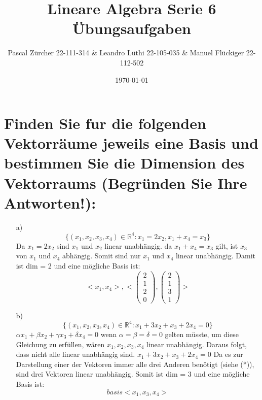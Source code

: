 \documentclass{article}
\author{
Pascal Zürcher 22-111-314 & 
Leandro Lüthi 22-105-035 & 
Manuel Flückiger 22-112-502}
\title{Lineare Algebra Serie 6 Übungsaufgaben}
\date{\today}
\begin{document}
\maketitle



\section{Finden Sie fur die folgenden Vektorräume jeweils eine Basis und
bestimmen Sie die Dimension des Vektorraums (Begründen Sie Ihre Antworten!):}
    \begin{enumerate}

        \item[a)] \[\{(x_1, x_2, x_3, x_4) ∈ \mathbb{R}^4   : x_1 = 2x_2, x_1 + x_4 = x_3\}\]
        Da $x_1 = 2x_2$ sind $x_1$ und $x_2$ linear 
        unabhängig. da $x_1 + x_4 = x_3$ gilt, ist $x_3$ von $x_1$ und $x_4$ 
        abhängig. Somit sind nur $x_1$ und $x_4$ linear unabhängig.
        Damit ist dim = 2 und eine mögliche Basis ist:
        \[<x_1, x_4> ,
        <\left(\begin{array}{c}2\\1\\2\\0\end{array}\right),
        \left(\begin{array}{c}2\\1\\3\\1\end{array}\right)>\]

        \item[b)]\[\{(x_1, x_2, x_3, x_4) ∈ \mathbb{R}^4   : x_1+3x_2+x_3+2x_4=0\}\]
        \newline
        $\alpha x_1 + \beta x_2 + \gamma x_3 + \delta x_4 = 0$ wenn $\alpha = \beta=\delta=0$
        gelten müsste, um diese Gleichung zu erfüllen, wären $x_1,x_2,x_3,x_4$ linear unabhängig.
        Daraus folgt, dass nicht alle linear unabhängig sind. $x_1+3x_2+x_3+2x_4 = 0$ Da es zur 
        Darstellung einer der Vektoren immer alle drei Anderen benötigt (siehe (*)), sind 
        drei Vektoren linear unabhängig. Somit ist dim = 3 und eine mögliche Basis 
        ist: 
        \[basis <x_1,x_3,x_4>\]


\end{enumerate}
\end{document}
